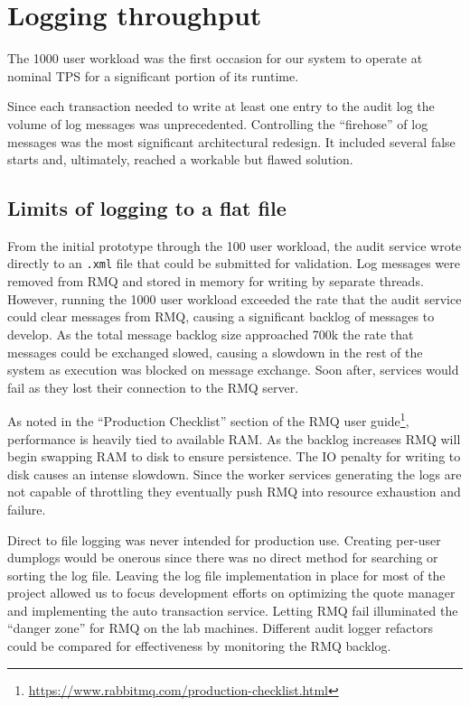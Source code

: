 \section{Logging throughput}
The 1000 user workload was the first occasion for our system to operate at nominal TPS for a significant portion of its runtime.

Since each transaction needed to write at least one entry to the audit log the volume of log messages was unprecedented.
Controlling the ``firehose'' of log messages was the most significant architectural redesign.
It included several false starts and, ultimately, reached a workable but flawed solution.

\subsection{Limits of logging to a flat file}
From the initial prototype through the 100 user workload, the audit service wrote directly to an \texttt{.xml} file that could be submitted for validation.
Log messages were removed from RMQ and stored in memory for writing by separate threads.
However, running the 1000 user workload exceeded the rate that the audit service could clear messages from RMQ, causing a significant backlog of messages to develop.
As the total message backlog size approached 700k the rate that messages could be exchanged slowed, causing a slowdown in the rest of the system as execution was blocked on message exchange.
Soon after, services would fail as they lost their connection to the RMQ server.

As noted in the ``Production Checklist'' section of the RMQ user guide\footnote{\url{https://www.rabbitmq.com/production-checklist.html}}, performance is heavily tied to available RAM.
As the backlog increases RMQ will begin swapping RAM to disk to ensure persistence.
The IO penalty for writing to disk causes an intense slowdown.
Since the worker services generating the logs are not capable of throttling they eventually push RMQ into resource exhaustion and failure.

Direct to file logging was never intended for production use.
Creating per-user dumplogs would be onerous since there was no direct method for searching or sorting the log file.
Leaving the log file implementation in place for most of the project allowed us to focus development efforts on optimizing the quote manager and implementing the auto transaction service.
Letting RMQ fail illuminated the ``danger zone'' for RMQ on the lab machines.
Different audit logger refactors could be compared for effectiveness by monitoring the RMQ backlog.

